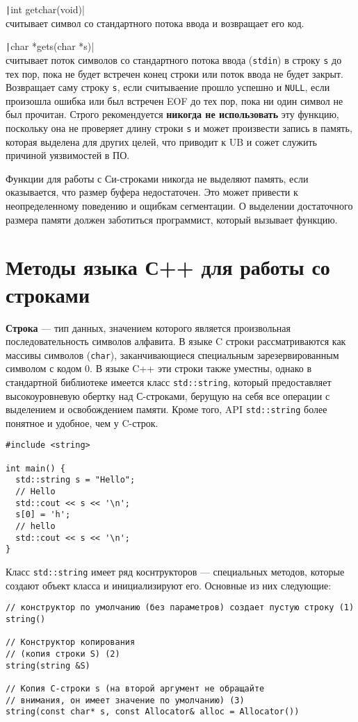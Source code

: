 \texttt|int getchar(void)|\\
считывает символ со стандартного потока ввода и возвращает его код.

\texttt|char *gets(char *s)|\\
считывает поток символов со стандартного потока ввода (\verb|stdin|)
в строку \verb|s| до тех пор, пока не будет встречен конец строки или
поток ввода не будет закрыт. Возвращает саму строку \verb|s|, если
считываение прошло успешно и \verb|NULL|, если произошла ошибка или
был встречен EOF до тех пор, пока ни один символ не был прочитан.
Строго рекомендуется \textbf{никогда не использовать} эту функцию,
поскольку она не проверяет длину строки \verb|s| и может произвести
запись в память, которая выделена для других целей, что приводит к
UB и сожет служить причиной уязвимостей в ПО.

\vspace{0.6cm}

Функции для работы с Си-строками никогда не выделяют память, если оказывается, что размер буфера недостаточен. Это 
может привести к неопределенному поведению и ощибкам сегментации. О выделении
достаточного размера памяти должен заботиться программист, который вызывает функцию.

\section{Методы языка С++ для работы со строками}
\textbf{Строка} --- тип данных, значением которого является произвольная последовательность
символов алфавита.
В языке C строки рассматриваются как массивы символов (\verb|char|), заканчивающиеся
специальным зарезервированным символом с кодом 0.
В языке C++ эти строки также уместны, однако в стандартной библиотеке имеется
класс \verb|std::string|, который предоставляет высокоуровневую обертку над
С-строками, берущую на себя все операции с выделением и освобождением памяти.
Кроме того, API \verb|std::string| более понятное и удобное, чем у C-строк.
\begin{verbatim}
#include <string>

int main() {
  std::string s = "Hello";
  // Hello
  std::cout << s << '\n';
  s[0] = 'h';
  // hello
  std::cout << s << '\n';
}
\end{verbatim}

Класс \verb|std::string| имеет ряд коснтрукторов --- специальных методов, которые создают
объект класса и инициализируют его. Основные из них следующие:
\begin{verbatim}
// конструктор по умолчанию (без параметров) создает пустую строку (1)
string()

// Конструктор копирования
// (копия строки S) (2)
string(string &S)

// Копия C-строки s (на второй аргумент не обращайте
// внимания, он имеет значение по умолчанию) (3)
string(const char* s, const Allocator& alloc = Allocator()) 
\end{verbatim}

